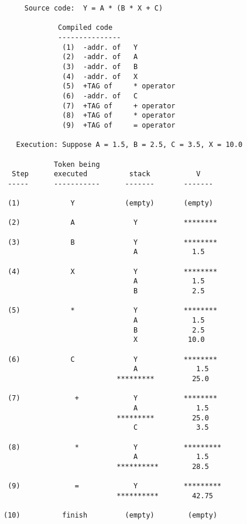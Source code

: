 \begin{verbatim}
     Source code:  Y = A * (B * X + C)

             Compiled code
             ---------------
              (1)  -addr. of   Y
              (2)  -addr. of   A
              (3)  -addr. of   B
              (4)  -addr. of   X
              (5)  +TAG of     * operator
              (6)  -addr. of   C
              (7)  +TAG of     + operator
              (8)  +TAG of     * operator
              (9)  +TAG of     = operator

   Execution: Suppose A = 1.5, B = 2.5, C = 3.5, X = 10.0

            Token being
  Step      executed          stack           V
 -----      -----------      -------       -------

 (1)            Y            (empty)       (empty)

 (2)            A              Y           ********

 (3)            B              Y           ********
                               A             1.5

 (4)            X              Y           ********
                               A             1.5
                               B             2.5

 (5)            *              Y           ********
                               A             1.5
                               B             2.5
                               X            10.0

 (6)            C              Y           ********
                               A              1.5
                           *********         25.0

 (7)             +             Y           ********
                               A              1.5
                           *********         25.0
                               C              3.5

 (8)             *             Y           *********
                               A              1.5
                           **********        28.5

 (9)             =             Y           *********
                           **********        42.75

(10)          finish         (empty)        (empty)


\end{verbatim}

